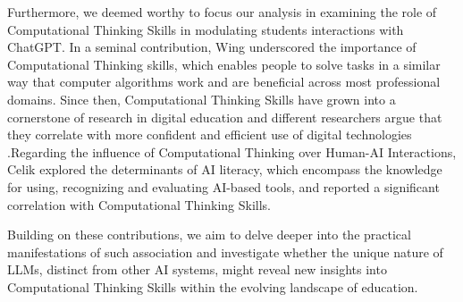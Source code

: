 \documentclass[sn-mathphys, Numbered]{sn-jnl}%
\theoremstyle{thmstyleone}%
\theoremstyle{thmstyletwo}%
\theoremstyle{thmstylethree}%
\begin{document}
Furthermore, we deemed worthy to focus our analysis in examining the role of Computational Thinking Skills in modulating students interactions with ChatGPT. In a seminal contribution, Wing \parencite*{wing_computational_2006} underscored the importance of Computational Thinking skills, which enables people to solve tasks in a similar way that computer algorithms work and are beneficial across most professional domains. Since then, Computational Thinking Skills have grown into a cornerstone of research in digital education and different researchers argue that they correlate with more confident and efficient use of digital technologies \parencite{cansu_overview_2019,grover_computational_2013, shute_demystifying_2017}.Regarding the influence of Computational Thinking over Human-AI Interactions, Celik \parencite*{celik_exploring_2023} explored the determinants of AI literacy, which encompass the knowledge for using, recognizing and evaluating AI-based tools, and reported a significant correlation with Computational Thinking Skills. 

Building on these contributions, we aim to delve deeper into the practical manifestations of such association and investigate whether the unique nature of LLMs, distinct from other AI systems, might reveal new insights into Computational Thinking Skills within the evolving landscape of education. 


\end{document}
